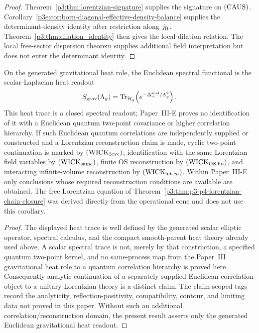 \documentclass[12pt,a4paper]{article}
\begin{document}
\begin{proof}
Theorem~\ref{p3:thm:lorentzian-signature} supplies the signature on
\(({\rm CAUS})\).  Corollary~\ref{p3e:cor:born-diagonal-effective-density-balance}
supplies the determinant-density identity after restriction along
\(j_{\rm B}\).  Theorem~\ref{p3:thm:dilation_identity} then gives the local
dilation relation.
The local free-sector dispersion theorem supplies additional field
interpretation but does not enter the determinant identity.
\end{proof}

\begin{corollary}\label{p3:cor:wick-from-gp-constitution}
On the generated gravitational heat role, the Euclidean spectral functional
is the scalar-Laplacian heat readout
\[
 S_{\rm grav}(\Lambda_g)
 =\operatorname{Tr}_{\mathcal H_g}\!\left(e^{-\Delta_+^{\rm scal}/\Lambda_g^2}\right).
\]
This heat trace is a closed spectral readout; Paper~III-E proves no
identification of it with a Euclidean quantum two-point covariance or higher
correlation hierarchy.  If such Euclidean quantum correlations are
independently supplied or constructed and a Lorentzian reconstruction claim
is made, cyclic two-point continuation is marked by
\(({\rm WICK}_{2{\rm cyc}})\), identification with the same Lorentzian field
variables by \(({\rm WICK}_{\rm same})\), finite OS reconstruction by
\(({\rm WICK}_{\rm OS,fin})\), and interacting infinite-volume reconstruction
by \(({\rm WICK}_{\rm int,\infty})\).  Within Paper~III-E only conclusions
whose required reconstruction conditions are available are obtained.  The
free Lorentzian equation of
Theorem~\ref{p3:thm:p3-p4-lorentzian-chain-closure} was derived directly from
the operational cone and does not use this corollary.
\end{corollary}
\begin{proof}
The displayed heat trace is well defined by the generated scalar elliptic
operator, spectral calculus, and the compact smooth-parent heat theory already
used above.  A scalar spectral trace is not, merely by that construction, a
specified quantum two-point kernel, and no same-process map from the
Paper~III gravitational heat role to a quantum correlation hierarchy is
proved here.  Consequently analytic continuation of a separately supplied
Euclidean correlation object to a unitary Lorentzian theory is a distinct
claim.  The claim-scoped tags record the analyticity, reflection-positivity,
compatibility, contour, and limiting data not proved in this paper.  Without
such an additional correlation/reconstruction domain, the present result
asserts only the generated Euclidean gravitational heat readout.
\end{proof}
\end{document}
